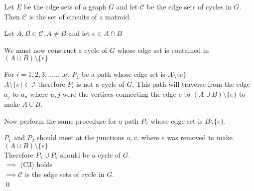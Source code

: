 \documentclass[../main.tex]{subfiles}
\begin{document}
 \begin{thm}
 Let $E$ be the edge sets of a graph $G$ and let $\mathcal{C}$ be the edge sets of cycles in $G$.\\
 \noindent Then $\mathcal{C}$ is the set of circuits of a matroid.

 \end{thm}

\noindent\textbf\Proof
Let $A, B \in \mathcal{C}, A \neq B $ and let $e \in A \cap B $

\vspace{1mm}

\noindent We must now construct a cycle of $G$ whose edge set is contained in $(A \cup B) \setminus \{e\}$

\vspace{2mm}

\noindent For $ i = 1,2,3,...... $ let $P_1$ be a path whose edge set is $ A \setminus \{e\}$\\
\noindent $ A \setminus \{e\} \in \mathcal{I} $ therefore $P_i$ is not a cycle of $G$. This path will traverse from the edge $a_j$ to $a_u$ where $u,j$ were the vertices connecting the edge e to $(A \cup B) \setminus \{e\}$ to make $A \cup B$.

\vspace{2mm}

\noindent Now perform the same procedure for a path $P_2$ whose edge set is $B \setminus \{e\}$.

\vspace{2mm}

\noindent $P_1$ and $P_2$ should meet at the junctions $u,v$,  where $e$ was removed to make $ (A \cup B) \setminus \{e\}$\\
\noindent Therefore $P_1 \cup P_2$ should be a cycle of $G$.\\
\noindent $\implies$ (C3) holds\\
\noindent $\implies \mathcal{C}$ is the edge sets of cycle in $G$.\\
\qed
\end{document}
